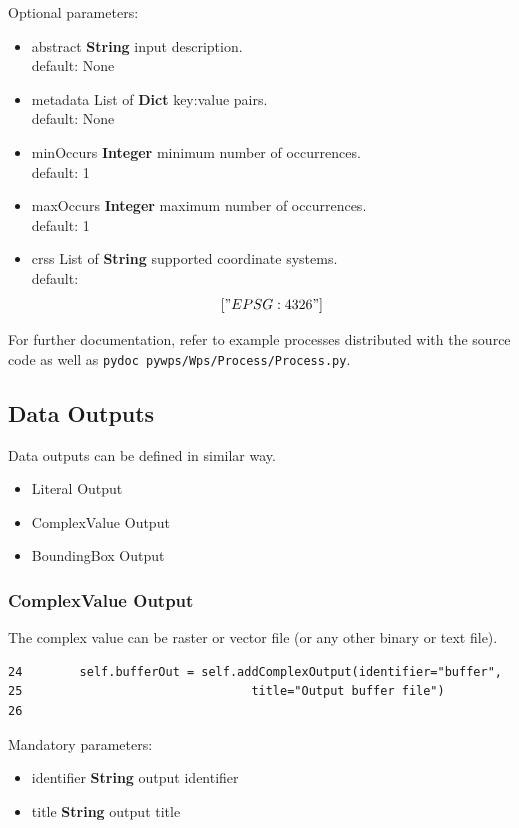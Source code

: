 \documentclass[a4paper,11pt]{report}
\begin{document}
Optional parameters:
\begin{itemize}
\item abstract \textbf{String} input description.\\
        default: None
\item metadata List of \textbf{Dict} {key:value} pairs.\\
        default: None
\item minOccurs \textbf{Integer} minimum number of occurrences.\\
        default: 1
\item maxOccurs \textbf{Integer} maximum number of occurrences.\\
        default: 1
\item crss List of \textbf{String} supported coordinate systems.\\
        default: \[["EPSG:4326"]\]
\end{itemize}

For further documentation, refer to example processes distributed with the
source code as well as \texttt{pydoc~pywps/Wps/Process/Process.py}. 

\subsection{Data Outputs}
Data outputs can be defined in similar way.
\begin{itemize}
    \item Literal Output
    \item ComplexValue Output
    \item BoundingBox Output
\end{itemize}
    
\subsubsection{ComplexValue Output}
The complex value can be raster or vector file (or any other binary or text
file).

\begin{verbatim}
24        self.bufferOut = self.addComplexOutput(identifier="buffer",
25                                title="Output buffer file")
26
\end{verbatim}

Mandatory parameters:
\begin{itemize}
\item identifier \textbf{String} output identifier
\item title \textbf{String} output title
\end{itemize}
\end{document}
